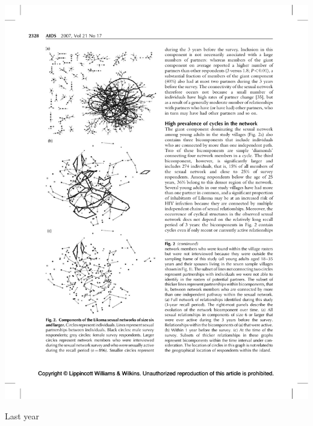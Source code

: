 \documentclass[aspectratio=169]{beamer}
\begin{document}
\begin{frame}
\frametitle{}

\begin{center}
\includegraphics[height = 0.75\textheight]{figures/helleringer_sexual_2007_fig2b}
\end{center}

\vfill

Last year


\end{frame}
\end{document}
